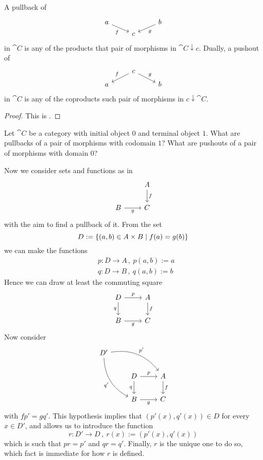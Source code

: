 \begin{proposition}
  A pullback of
  \[\begin{tikzcd}[row sep=tiny]
      a \ar["f", dr, swap] &   & b \ar["g", dl] \\
      & c &
    \end{tikzcd}\] in \(\cat C\) is any of the products that pair of
  morphisms in \(\cat C {\downarrow} c\). Dually, a pushout of
  \[\begin{tikzcd}[row sep=tiny]
      & c \ar["f", dl, swap] \ar["g", dr] & \\
      a & & b
    \end{tikzcd}\] in \(\cat C\) is any of the coproducts such pair of
  morphisms in \(c {\downarrow} \cat C\).
\end{proposition}

\begin{proof}
  This is .
\end{proof}

\begin{exercise}
  Let \(\cat C\) be a category with initial object \(0\) and terminal
  object \(1\). What are pullbacks of a pair of morphisms with
  codomain \(1\)? What are pushouts of a pair of morphisms with domain
  \(0\)?
\end{exercise}

\begin{example}\label{example:PullbacksInSet}
  Now we consider sets and functions as in
  \[\begin{tikzcd}
      & A \ar["f", d] \\
      B \ar["g", r, swap] & C
    \end{tikzcd}\] with the aim to find a pullback of it. From the set
  \[D := \left\{(a, b) \in A \times B \mid f(a) = g(b)\right\}\] we can make the
  functions
  \begin{align*}
    & p : D \to A\,, \ p(a, b) := a \\
    & q : D \to B\,, \ q(a, b) := b
  \end{align*}
  Hence we can draw at least the commuting square
  \[\begin{tikzcd}
      D \ar["p", r] \ar["q", d, swap] & A \ar["f", d] \\
      B \ar["g", r, swap] & C
    \end{tikzcd}\] Now consider
  \[\begin{tikzcd}
      D' \ar["{p'}", drr, bend left] \ar["{q'}", ddr, bend right, swap]                 \\
      & D \ar["p", r] \ar["q", d, swap]                                & A \ar["f", d] \\
      & B \ar["g", r, swap] & C
    \end{tikzcd}\] with \(fp' = gq'\). This hypothesis implies that
  \(\left(p'(x), q'(x)\right) \in D\) for every \(x \in D'\), and allows
  us to introduce the function
  \[r : D' \to D\,, \ r(x) := \left(p'(x), q'(x)\right)\] which is such
  that \(p r = p'\) and \(q r = q'\). Finally, \(r\) is the unique one
  to do so, which fact is immediate for how \(r\) is defined.
\end{example}

